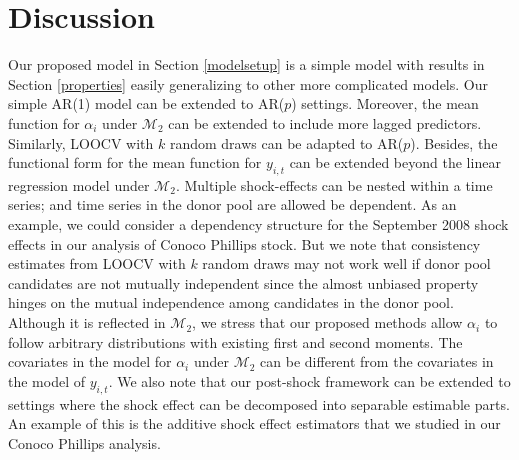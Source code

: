 \documentclass[11pt]{article}
\def\mc#1{\mathcal{#1}} %
\theoremstyle{definition}
\begin{document}
\section{Discussion}
\label{discussion}



Our proposed model in Section \ref{modelsetup} is a simple model with results in Section \ref{properties} easily generalizing to other more complicated models. Our simple AR(1) model can be extended to AR($p$) settings. %
Moreover, the mean function for $\alpha_i$ under $\mc{M}_2$ can be extended to include more lagged predictors. Similarly, LOOCV with $k$ random draws can be adapted to AR($p$). Besides, the functional form for the mean function for $y_{i,t}$ can be extended beyond the linear regression model under $\mc{M}_2$. Multiple shock-effects can be nested within a time series; and time series in the donor pool are allowed be dependent. As an example, we could consider a dependency structure for the September 2008 shock effects in our analysis of Conoco Phillips stock. But we note that consistency estimates from LOOCV with $k$ random draws may not work well if donor pool candidates are not mutually independent since the almost unbiased property hinges on the mutual independence among candidates in the donor pool.
Although it is reflected in $\mc{M}_2$, we stress that our proposed methods allow $\alpha_i$ to follow arbitrary distributions with existing first and second moments. The covariates in the model for $\alpha_i$ under $\mc{M}_2$ can be different from the covariates in the model of $y_{i,t}$. We also note that our post-shock framework can be extended to settings where the shock effect can be decomposed into separable estimable parts. An example of this is the additive shock effect estimators that we studied in our Conoco Phillips analysis. 
\end{document}
